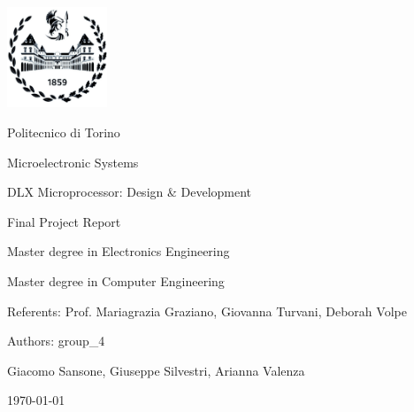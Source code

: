 \frontmatter
\begin{titlepage}
\vspace{0cm}
\centerline{
\includegraphics[width=3cm]{./images/logopoli}} 
\vspace{0.5cm}
\centerline{\LARGE Politecnico di Torino}
\vspace{2.5cm}
\centerline{\huge\sf Microelectronic Systems}
\vspace{1cm}
\centerline{\Huge\sf DLX Microprocessor: Design \& Development}
\bigskip
\centerline{\huge\sf Final Project Report}
\vspace{2cm}
\centerline{\Large Master degree in Electronics Engineering}
\bigskip
\centerline{\Large Master degree in Computer Engineering}
\vspace{4.5cm}
%
\centerline{\large Referents: Prof. Mariagrazia Graziano, Giovanna Turvani, Deborah Volpe}
\bigskip
\vspace{1cm}
%
%
\centerline{\large Authors: group\_4}
\bigskip
%
%
\centerline{\large Giacomo Sansone, Giuseppe Silvestri, Arianna Valenza}
%
\vspace{2cm}
\centerline{\large \today}
\end{titlepage}